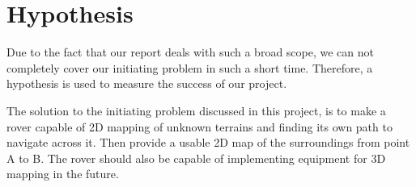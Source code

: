 \section{Hypothesis}

Due to the fact that our report deals with such a broad scope, we can not completely cover our initiating problem in such a short time. Therefore, a hypothesis is used to measure the success of our project. 

The solution to the initiating problem discussed in this project, is to make a rover capable of 2D mapping of unknown terrains and finding its own path to navigate across it. Then provide a usable 2D map of the surroundings from point A to B. The rover should also be capable of implementing equipment for 3D mapping in the future.
